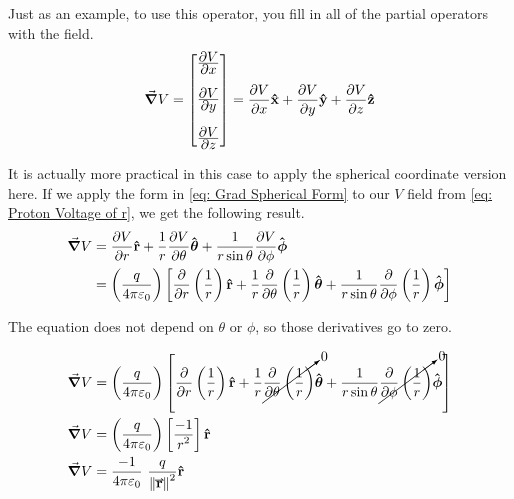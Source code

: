 \documentclass[main.tex]{subfiles}
\begin{document}
                    Just as an example, to use this operator, you fill in all of the partial operators with the field.
                    \begin{equation}
                        \grad{V} = \Matrix{\bfrac{\partial V}{\partial x} \vspace{1em}\\\bfrac{\partial V}{\partial y} \vspace{1em}\\\bfrac{\partial V}{\partial z}} = \bfrac{\partial V}{\partial x}\vhat{x} + \bfrac{\partial V}{\partial y}\vhat{y} + \bfrac{\partial V}{\partial z}\vhat{z}
                    \end{equation}

                    \vspace{2em}
                    It is actually more practical in this case to apply the spherical coordinate version here. If we apply the form in \eqref{eq: Grad Spherical Form} to our $V$ field from \eqref{eq: Proton Voltage of r}, we get the following result.
                    \begin{align*}
                        \grad{V} &= \frac{\displaystyle \partial V}{\displaystyle \partial r} \boldsymbol{\mathbf{\hat{r}}} + \frac{\displaystyle 1}{\displaystyle r} \frac{\displaystyle \partial V}{\displaystyle \partial \theta} \boldsymbol{\mathbf{\hat{\theta}}} + \frac{\displaystyle 1}{\displaystyle r\sin\theta}\frac{\displaystyle \partial V}{\displaystyle \partial \phi} \boldsymbol{\mathbf{\hat{\phi}}}\\
                        &= \left(\frac{\displaystyle q}{\displaystyle 4\pi\varepsilon_0}\right)\left[\frac{\displaystyle \partial}{\displaystyle \partial r}\left(\frac{\displaystyle 1}{\displaystyle r}\right) \boldsymbol{\mathbf{\hat{r}}} + \frac{\displaystyle 1}{\displaystyle r} \frac{\displaystyle \partial }{\displaystyle \partial \theta}\left(\frac{\displaystyle 1}{\displaystyle r}\right) \boldsymbol{\mathbf{\hat{\theta}}} + \frac{\displaystyle 1}{\displaystyle r\sin\theta}\frac{\displaystyle \partial }{\displaystyle \partial \phi}\left(\frac{\displaystyle 1}{\displaystyle r}\right) \boldsymbol{\mathbf{\hat{\phi}}}\right]
                    \end{align*}

                    The equation does not depend on $\theta$ or $\phi$, so those derivatives go to zero.

                    \begin{align}
                        \grad{V} &= \left(\bfrac{q}{4\pi\varepsilon_0}\right)\left[\bfrac{\partial}{\partial r}\left(\bfrac{1}{r}\right) \vhat{r} + \bfrac{1}{r} \cancelto{0}{\bfrac{\partial }{\partial \theta}\left(\bfrac{1}{r}\right)} \vhat{\theta} + \bfrac{1}{r\sin\theta}\cancelto{0}{\bfrac{\partial }{\partial \phi}\left(\bfrac{1}{r}\right)} \vhat{\phi}\right]\nonumber\\
                        \grad{V} &= \left(\bfrac{q}{4\pi\varepsilon_0}\right) \left[\bfrac{-1}{r^2}\right]\vhat{r}\nonumber\\
                        \grad{V} &=\bfrac{-1}{4\pi\varepsilon_0}\ \bfrac{q}{\vmod{\vect{r}}^2}\vhat{r} \label{eq: Gradient Field of Proton Voltage}
                    \end{align}\\
\end{document}
